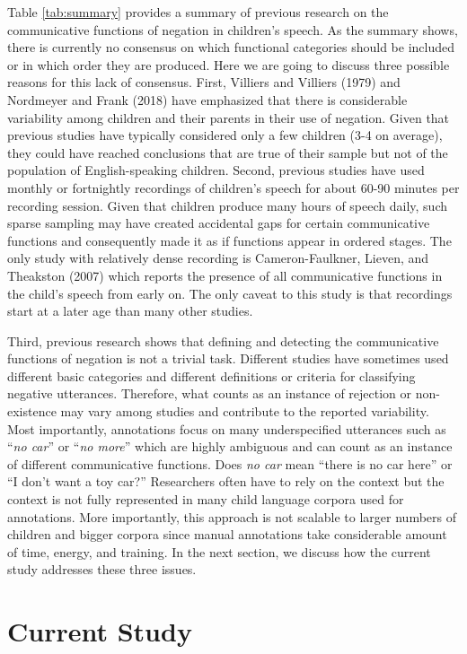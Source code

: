 \documentclass[
  english,
  man,floatsintext]{apa6}
\begin{document}
Table \ref{tab:summary} provides a summary of previous research on the communicative functions of negation in children's speech. As the summary shows, there is currently no consensus on which functional categories should be included or in which order they are produced. Here we are going to discuss three possible reasons for this lack of consensus. First, Villiers and Villiers (1979) and Nordmeyer and Frank (2018) have emphasized that there is considerable variability among children and their parents in their use of negation. Given that previous studies have typically considered only a few children (3-4 on average), they could have reached conclusions that are true of their sample but not of the population of English-speaking children. Second, previous studies have used monthly or fortnightly recordings of children's speech for about 60-90 minutes per recording session. Given that children produce many hours of speech daily, such sparse sampling may have created accidental gaps for certain communicative functions and consequently made it as if functions appear in ordered stages. The only study with relatively dense recording is Cameron-Faulkner, Lieven, and Theakston (2007) which reports the presence of all communicative functions in the child's speech from early on. The only caveat to this study is that recordings start at a later age than many other studies.

Third, previous research shows that defining and detecting the communicative functions of negation is not a trivial task. Different studies have sometimes used different basic categories and different definitions or criteria for classifying negative utterances. Therefore, what counts as an instance of rejection or non-existence may vary among studies and contribute to the reported variability. Most importantly, annotations focus on many underspecified utterances such as ``\emph{no car}'' or ``\emph{no more}'' which are highly ambiguous and can count as an instance of different communicative functions. Does \emph{no car} mean ``there is no car here'' or ``I don't want a toy car?'' Researchers often have to rely on the context but the context is not fully represented in many child language corpora used for annotations. More importantly, this approach is not scalable to larger numbers of children and bigger corpora since manual annotations take considerable amount of time, energy, and training. In the next section, we discuss how the current study addresses these three issues.

\hypertarget{current-study}{%
\section{Current Study}\label{current-study}}
\end{document}

